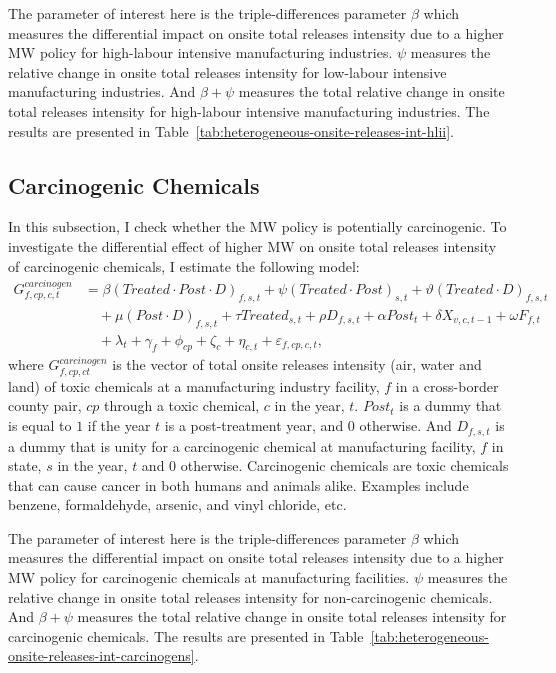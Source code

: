 \documentclass[12pt, english]{article}
\begin{document}
    The parameter of interest here is the triple-differences parameter $\beta$ which measures the differential impact on onsite total releases intensity due to a higher MW policy for high-labour intensive manufacturing industries. $\psi$ measures the relative change in onsite total releases intensity for low-labour intensive manufacturing industries. And $\beta + \psi$ measures the total relative change in onsite total releases intensity for high-labour intensive manufacturing industries. The results are presented in Table~\ref{tab:heterogeneous-onsite-releases-int-hlii}.
    

    \subsection{Carcinogenic Chemicals}\label{subsec:carcinogenic-chemicals}
    In this subsection, I check whether the MW policy is potentially carcinogenic. To investigate the differential effect of higher MW on onsite total releases intensity of carcinogenic chemicals, I estimate the following model:
    \begin{align}
        G_{f,cp,c,t}^{carcinogen} &= \beta (Treated \cdot Post \cdot D)_{f,s,t} + \psi (Treated \cdot Post)_{s,t} + \vartheta (Treated \cdot D)_{f,s,t} \nonumber \\
        &\quad + \mu (Post \cdot D)_{f,s,t} + \tau Treated_{s,t} + \rho D_{f,s,t} + \alpha Post_{t} + \delta X_{v,c,t-1} + \omega F_{f,t} \nonumber \\
        &\quad + \lambda_{t} + \gamma_{f} + \phi_{cp} + \zeta_{c} + \eta_{c,t} + \varepsilon_{f,cp,c,t},\label{eq:heterogeneous-onsite-releases-intensity-carcinogens}
    \end{align}
    where $G_{f,cp,ct}^{carcinogen}$ is the vector of total onsite releases intensity (air, water and land) of toxic chemicals at a manufacturing industry facility, $f$ in a cross-border county pair, $cp$ through a toxic chemical, $c$ in the year, $t$. $Post_{t}$ is a dummy that is equal to $1$ if the year $t$ is a post-treatment year, and $0$ otherwise. And $D_{f,s,t}$ is a dummy that is unity for a carcinogenic chemical at manufacturing facility, $f$ in state, $s$ in the year, $t$ and $0$ otherwise. Carcinogenic chemicals are toxic chemicals that can cause cancer in both humans and animals alike. Examples include benzene, formaldehyde, arsenic, and vinyl chloride, etc.
    

    The parameter of interest here is the triple-differences parameter $\beta$ which measures the differential impact on onsite total releases intensity due to a higher MW policy for carcinogenic chemicals at manufacturing facilities. $\psi$ measures the relative change in onsite total releases intensity for non-carcinogenic chemicals. And $\beta + \psi$ measures the total relative change in onsite total releases intensity for carcinogenic chemicals. The results are presented in Table~\ref{tab:heterogeneous-onsite-releases-int-carcinogens}.
    
\end{document}
